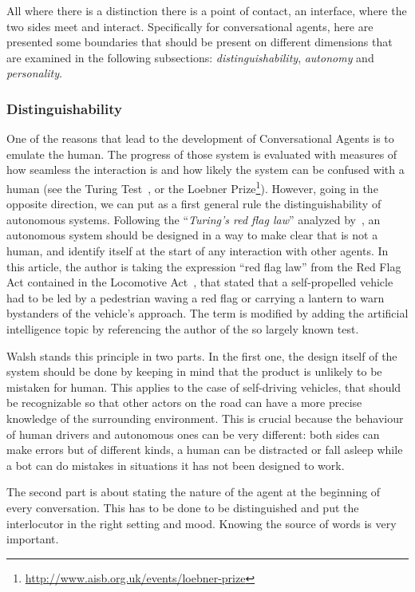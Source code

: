 All where there is a distinction there is a point of contact, an interface, where the two sides meet and interact. Specifically for conversational agents, here are presented some boundaries that should be present on different dimensions that are examined in the following subsections: \textit{distinguishability}, \textit{autonomy} and \textit{personality}.

\subsubsection{Distinguishability}
One of the reasons that lead to the development of Conversational Agents is to emulate the human. The progress of those system is evaluated with measures of how seamless the interaction is and how likely the system can be confused with a human (see the Turing Test~\cite{turing1950computing}, or the Loebner Prize\footnote{\url{http://www.aisb.org.uk/events/loebner-prize}}). However, going in the opposite direction, we can put as a first general rule the distinguishability of autonomous systems. Following the ``\textit{Turing's red flag law}''  analyzed by~\cite{walsh2016turing}, an autonomous system should be designed in a way to make clear that is not a human, and identify itself at the start of any interaction with other agents. In this article, the author is taking the expression ``red flag law''  from the Red Flag Act contained in the Locomotive Act~\cite{rickards1817statutes}, that stated that a self-propelled vehicle had to be led by a pedestrian waving a red flag or carrying a lantern to warn bystanders of the vehicle's approach. The term is modified by adding the artificial intelligence topic by referencing the author of the so largely known test.

Walsh stands this principle in two parts. In the first one, the design itself of the system should be done by keeping in mind that the product is unlikely to be mistaken for human. This applies to the case of self-driving vehicles, that should be recognizable so that other actors on the road can have a more precise knowledge of the surrounding environment. This is crucial because the behaviour of human drivers and autonomous ones can be very different: both sides can make errors but of different kinds, a human can be distracted or fall asleep while a bot can do mistakes in situations it has not been designed to work.

The second part is about stating the nature of the agent at the beginning of every conversation. This has to be done to be distinguished and put the interlocutor in the right setting and mood. Knowing the source of words is very important.

